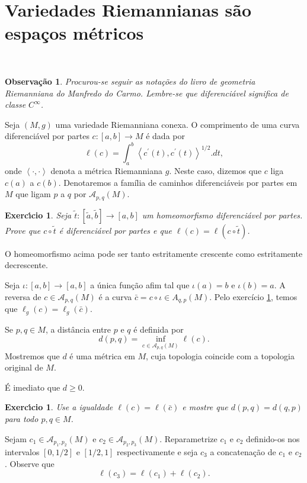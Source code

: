 \documentclass{article}[11pt]
\newtheorem{observation}[theorem]{Observa\c c\~ao}
\newtheorem{exercicio}[theorem]{Exerc\'\i cio}
\begin{document}
\section{Variedades Riemannianas são espaços métricos}

\

\begin{observation}
Procurou-se seguir as notações do livro de geometria Riemanniana do Manfredo do Carmo.
Lembre-se que diferenciável significa de classe $C^\infty$.
\end{observation}

Seja $(M,g)$ uma variedade Riemanniana conexa.
O comprimento de uma curva diferenciável por partes $c : [a,b] \rightarrow M$ é dada por
\[
\ell(c) = \int_a^b \left< c^\prime(t), c^\prime(t)\right>^{1/2}.dt,
\]
onde $\left< \cdot, \cdot\right>$ denota a métrica Riemanniana $g$. 
Neste caso, dizemos que $c$ liga $c(a)$ a $c(b)$.
Denotaremos a família de caminhos diferenciáveis por partes em $M$ que ligam $p$ a $q$ por $\mathcal A_{p,q}(M)$. 

\begin{exercicio}
\label{reparametrizacao}
Seja $\tilde t:[\tilde a, \tilde b] \rightarrow [a,b]$ um homeomorfismo diferenciável por partes.
Prove que $c\circ \tilde t$ é diferenciável por partes e que $\ell(c) = \ell(c \circ \tilde t)$. 
\end{exercicio}

O homeomorfismo acima pode ser tanto estritamente crescente como estritamente decrescente.

Seja $\iota:[a,b] \rightarrow [a,b]$ a única função afim tal que $\iota(a) = b$ e $\iota(b) = a$.
A reversa de $c \in \mathcal A_{p,q}(M)$ é a curva $\bar c = c \circ \iota \in A_{q,p}(M)$.
Pelo exercício \ref{reparametrizacao}, temos que $\ell_g(c) = \ell_g(\bar c)$.

Se $p,q \in M$, a distância entre $p$ e $q$ é definida por
\[
d(p,q)=\inf_{c\in \mathcal A_{p,q}(M)} \ell(c).
\]
Mostremos que $d$ é uma métrica em $M$, cuja topologia coincide com a topologia original de $M$.

É imediato que $d\geq 0$.

\begin{exercicio}
Use a igualdade $\ell(c) = \ell(\bar c)$ e mostre que $d(p,q) = d(q,p)$ para todo $p,q \in M$.
\end{exercicio}

Sejam $c_1\in \mathcal A_{p_1,p_2}(M)$ e $c_2 \in \mathcal A_{p_2,p_3}(M)$.
Reparametrize $c_1$ e $c_2$ definido-os nos intervalos $[0,1/2]$ e $[1/2,1]$ respectivamente e seja $c_3$ a concatenação de $c_1$ e $c_2$.
Observe que 
\[
\ell(c_3) = \ell(c_1) + \ell(c_2).
\]
\end{document}
